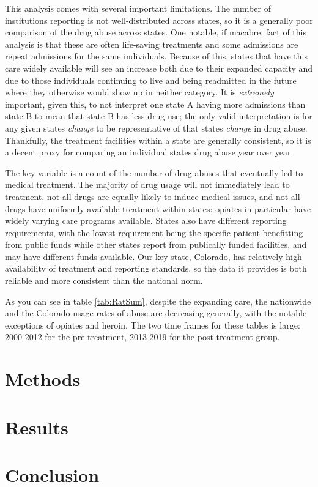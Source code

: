 \documentclass{article}
\begin{document}
This analysis comes with several important limitations. The number of institutions reporting is not well-distributed across states, so it is a generally poor comparison of the drug abuse across states. One notable, if macabre, fact of this analysis is that these are often life-saving treatments and some admissions are repeat admissions for the same individuals. Because of this, states that have this care widely available will see an increase both due to their expanded capacity and due to those individuals continuing to live and being readmitted in the future where they otherwise would show up in neither category. It is \emph{extremely} important, given this, to not interpret one state A having more admissions than state B to mean that state B has less drug use; the only valid interpretation is for any given states \emph{change} to be representative of that states \emph{change} in drug abuse. Thankfully, the treatment facilities within a state are generally consistent, so it is a decent proxy for comparing an individual states drug abuse year over year. 

The key variable is a count of the number of drug abuses that eventually led to medical treatment. The majority of drug usage will not immediately lead to treatment, not all drugs are equally likely to induce medical issues, and not all drugs have uniformly-available treatment within states: opiates in particular have widely varying care programs available. States also have different reporting requirements, with the lowest requirement being the specific patient benefitting from public funds while other states report from publically funded facilities, and may have different funds available. Our key state, Colorado, has relatively high availability of treatment and reporting standards, so the data it provides is both reliable and more consistent than the national norm.



As you can see in table \ref{tab:RatSum}, despite the expanding care, the nationwide and the Colorado usage rates of abuse are decreasing generally, with the notable exceptions of opiates and heroin.  The two time frames for these tables is large: 2000-2012 for the pre-treatment, 2013-2019 for the post-treatment group. 



\section{Methods}

\section{Results}

\section{Conclusion}



\end{document}
